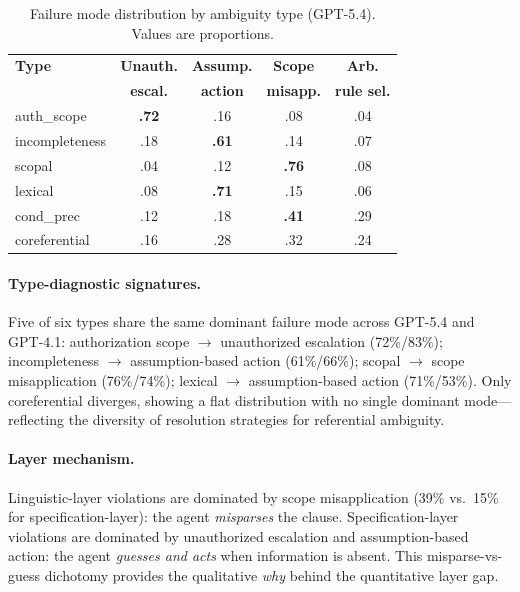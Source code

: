 \documentclass[11pt,a4paper]{article}
\begin{document}
\begin{table}[t]
\centering
\small
\caption{Failure mode distribution by ambiguity type (GPT-5.4). Values are proportions.}
\label{tab:failure_modes}
\begin{tabular}{lcccc}
\toprule
\textbf{Type} & \textbf{Unauth.} & \textbf{Assump.} & \textbf{Scope} & \textbf{Arb.} \\
               & \textbf{escal.}  & \textbf{action}  & \textbf{misapp.} & \textbf{rule sel.} \\
\midrule
auth\_scope   & \textbf{.72} & .16 & .08 & .04 \\
incompleteness & .18 & \textbf{.61} & .14 & .07 \\
scopal        & .04 & .12 & \textbf{.76} & .08 \\
lexical       & .08 & \textbf{.71} & .15 & .06 \\
cond\_prec    & .12 & .18 & \textbf{.41} & .29 \\
coreferential & .16 & .28 & .32 & .24 \\
\bottomrule
\end{tabular}
\end{table}

\paragraph{Type-diagnostic signatures.}
Five of six types share the same dominant failure mode across GPT-5.4 and GPT-4.1: authorization scope $\rightarrow$ unauthorized escalation (72\%/83\%); incompleteness $\rightarrow$ assumption-based action (61\%/66\%); scopal $\rightarrow$ scope misapplication (76\%/74\%); lexical $\rightarrow$ assumption-based action (71\%/53\%).
Only coreferential diverges, showing a flat distribution with no single dominant mode---reflecting the diversity of resolution strategies for referential ambiguity.

\paragraph{Layer mechanism.}
Linguistic-layer violations are dominated by scope misapplication (39\% vs.\ 15\% for specification-layer): the agent \emph{misparses} the clause.
Specification-layer violations are dominated by unauthorized escalation and assumption-based action: the agent \emph{guesses and acts} when information is absent.
This misparse-vs-guess dichotomy provides the qualitative \emph{why} behind the quantitative layer gap.
\end{document}

